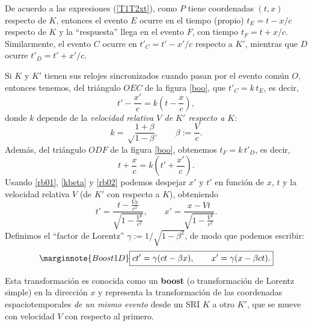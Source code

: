 De acuerdo a las expresiones (\ref{T1T2xt}), como $P$ tiene coordenadas $(t,x)$ respecto de $K$, entonces el evento $E$ ocurre en el tiempo (propio) $t_E=t-x/c$ respecto de $K$ y la ``respuesta'' llega en el evento $F$, con tiempo $t_F=t+x/c$. Similarmente, el evento $C$ ocurre en $t'_C=t'-x'/c$ respecto a $K'$, mientras que $D$ ocurre $t'_D=t'+x'/c$.

Si $K$ y $K'$ tienen sus relojes sincronizados cuando pasan por el evento común $O$, entonces tenemos, del triángulo $OEC$ de la figura \ref{boo}, que $t'_C=k\,t_E$, es decir,
\begin{equation}\label{rb01}
t'-\frac{x'}{c}=k\left(t-\frac{x}{c}\right),
\end{equation}
donde $k$ depende de la \textit{velocidad relativa $V$ de $K'$ respecto a $K$}:
\begin{equation}\label{kbeta}
k=\sqrt\frac{1+\beta}{1-\beta}, \qquad \beta:=\frac{V}{c}.
\end{equation}
Además, del triángulo $ODF$ de la figura \ref{boo}, obtenemos $t_F=k\,t'_D$, es decir,
\begin{equation}\label{rb02}
t+\frac{x}{c}=k\left(t'+\frac{x'}{c}\right).
\end{equation}
Usando \eqref{rb01}, \eqref{kbeta} y \eqref{rb02} podemos despejar $x'$ y $t'$ en función de $x$, $t$ y la velocidad relativa $V$ (de $K'$ con respecto a $K$), obteniendo
\begin{equation}
t'=\frac{t-\frac{Vx}{c^2}}{\sqrt{1-\frac{V^2}{c^2}}}, \qquad
x'=\frac{x-Vt}{\sqrt{1-\frac{V^2}{c^2}}}. \label{b1}
\end{equation}
Definimos el ``factor de Lorentz'' $\gamma:={1}/{\sqrt{1-\beta^ 2}}$, de modo que podemos escribir:
\begin{equation}\marginnote{Boost 1D}
\boxed{ct'=\gamma (ct-\beta x), \qquad x'=\gamma(x-\beta ct).} \label{boost1}
\end{equation}

Esta transformación es conocida como un \textbf{boost} (o transformación de Lorentz simple) en la dirección $x$ y representa la transformación de las coordenadas espaciotemporales \textit{de un mismo evento} desde un SRI $K$ a otro $K'$, que se mueve con velocidad $V$ con respecto al primero.


